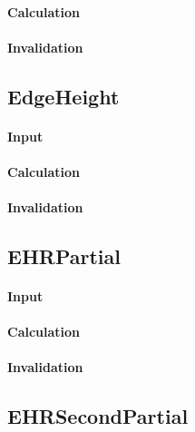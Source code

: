 \paragraph{Calculation}

\paragraph{Invalidation}

\bigskip

\subsection{EdgeHeight}

\paragraph{Input}

\paragraph{Calculation}

\paragraph{Invalidation}

\bigskip

\subsection{EHRPartial}

\paragraph{Input}

\paragraph{Calculation}

\paragraph{Invalidation}

\bigskip

\subsection{EHRSecondPartial}


